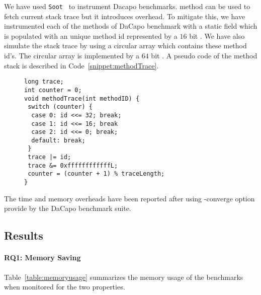  We have used \texttt{Soot}~\cite{soot} to
instrument Dacapo benchmarks.  method can be used to
fetch current stack trace but it introduces overhead. To mitigate this, we have
instrumented each of the methods of DaCapo benchmark with a static
 field which is populated with an unique method id represented by
a $16$ bit . We have also simulate the stack trace by using a
circular array which contains these method id's. The circular array is
implemented by a $64$ bit . A pseudo code of the method stack is
described in Code~\ref{snippet:methodTrace}.

 \begin{figure}[t]
\begin{lstlisting}
long trace;
int counter = 0;
void methodTrace(int methodID) {
 switch (counter) {
  case 0: id <<= 32; break;
  case 1: id <<= 16; break
  case 2: id <<= 0; break;
  default: break;
 }
 trace |= id;
 trace &= 0xffffffffffffL;
 counter = (counter + 1) % traceLength;
}
\end{lstlisting}
\end{figure}

The time and memory overheads have been reported after using -converge option 
provide by the DaCapo benchmark suite.

\subsection{Results}
\label{sec:results}

\paragraph{RQ1: Memory Saving}

Table~\ref{table:memoryusage} summarizes the memory usage of the benchmarks when 
monitored for the two properties.






